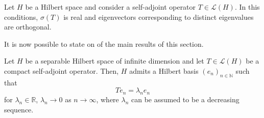 \begin{proposition}
    Let \(H\) be a Hilbert space and consider a self-adjoint operator \(T\in \mathcal{L}(H)\). In this conditions, \(\sigma(T)\) is real and eigenvectors corresponding to distinct eigenvalues are orthogonal.
\end{proposition}
It is now possible to state on of the main results of this section.
\begin{theorem}\label{spectral_theorem}
    Let \(H\) be a separable Hilbert space of infinite dimension and let \(T \in \mathcal{L}(H)\) be a compact self-adjoint operator. Then, \(H\) admits a Hilbert basis \((e_n)_{n \in \mathbb{N}}\) such that
    \[
        T e_n = \lambda_n e_n
    \]
    for \(\lambda_n \in \mathbb{R}\), \(\lambda_n \rightarrow 0\) as \(n \rightarrow \infty\), where \(\lambda_n\) can be assumed to be a decreasing sequence.
\end{theorem}\label{fredholm_alt}

